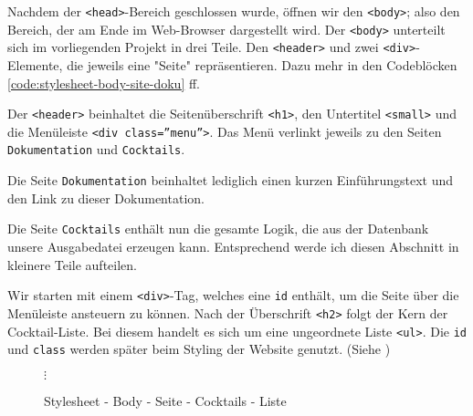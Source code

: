Nachdem der \texttt{<head>}-Bereich geschlossen wurde, öffnen wir den \texttt{<body>}; also den Bereich, der am Ende im Web-Browser dargestellt wird. Der \texttt{<body>} unterteilt sich im vorliegenden Projekt in drei Teile. Den \texttt{<header>} und zwei \texttt{<div>}-Elemente, die jeweils eine "Seite" repräsentieren. Dazu mehr in den Codeblöcken \ref{code:stylesheet-body-site-doku} ff.

Der \texttt{<header>} beinhaltet die Seitenüberschrift \texttt{<h1>}, den Untertitel \texttt{<small>} und die Menüleiste \texttt{<div class=''menu''>}. Das Menü verlinkt jeweils zu den Seiten \texttt{Dokumentation} und \texttt{Cocktails}.










Die Seite \texttt{Dokumentation} beinhaltet lediglich einen kurzen Einführungstext und den Link zu dieser Dokumentation.








Die Seite \texttt{Cocktails} enthält nun die gesamte Logik, die aus der Datenbank unsere Ausgabedatei erzeugen kann. Entsprechend werde ich diesen Abschnitt in kleinere Teile aufteilen.

Wir starten mit einem \texttt{<div>}-Tag, welches eine \texttt{id} enthält, um die Seite über die Menüleiste ansteuern zu können. Nach der Überschrift \texttt{<h2>} folgt der Kern der Cocktail-Liste. Bei diesem handelt es sich um eine ungeordnete Liste \texttt{<ul>}. Die \texttt{id} und \texttt{class} werden später beim Styling der Website genutzt. (Siehe )

\renewcommand{\figurename}{Codeblock}
\renewcommand{\thefigure}{2.16}
\begin{figure}[H]
\label{code:stylesheet-body-site-cocktails-liste}



$\vdots$



\caption{Stylesheet - Body - Seite - Cocktails - Liste}
\end{figure}

